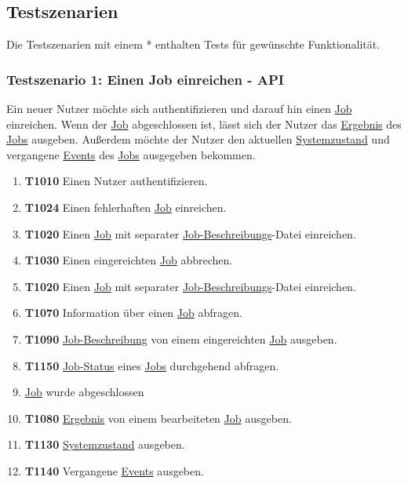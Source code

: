 \subsection{Testszenarien}
Die Testszenarien mit einem * enthalten Tests für gewünschte Funktionalität.

\subsubsection{Testszenario 1: Einen Job einreichen - API}
Ein neuer \gls{Nutzer} möchte sich authentifizieren und darauf hin einen \hyperref[B:Jobs]{Job} einreichen. Wenn der \hyperref[B:Jobs]{Job} abgeschlossen ist, lässt sich der \gls{Nutzer} das \hyperref[B:Job-Ergebnis]{Ergebnis} des \hyperref[B:Jobs]{Jobs} ausgeben. Außerdem möchte der \gls{Nutzer} den aktuellen \hyperref[B:Systemzustand]{Systemzustand} und vergangene \hyperref[B:Event]{Events} des \hyperref[B:Jobs]{Jobs} ausgegeben bekommen.

\begin{enumerate}
    \item \textbf{T1010} Einen \gls{Nutzer} authentifizieren.
    
    \item \textbf{T1024} Einen fehlerhaften \hyperref[B:Jobs]{Job} einreichen.
    
    \item \textbf{T1020} Einen \hyperref[B:Jobs]{Job} mit separater \hyperref[B:Job-Beschreibung]{Job-Beschreibungs}-Datei einreichen. 
    
    \item \textbf{T1030} Einen eingereichten \hyperref[B:Jobs]{Job} abbrechen.
    
    \item \textbf{T1020} Einen \hyperref[B:Jobs]{Job} mit separater \hyperref[B:Job-Beschreibung]{Job-Beschreibungs}-Datei einreichen. 
    
    \item \textbf{T1070} Information über einen \hyperref[B:Jobs]{Job} abfragen.
    
    \item \textbf{T1090} \hyperref[B:Job-Beschreibung]{Job-Beschreibung} von einem eingereichten \hyperref[B:Jobs]{Job} ausgeben.
    
    \item \textbf{T1150} \hyperref[B:Job-Status]{Job-Status} eines \hyperref[B:Jobs]{Jobs} durchgehend abfragen.
    
    \item \hyperref[B:Jobs]{Job} wurde abgeschlossen 
    
    \item \textbf{T1080} \hyperref[B:Job-Ergebnis]{Ergebnis} von einem bearbeiteten \hyperref[B:Jobs]{Job} ausgeben. 
    
    \item \textbf{T1130} \hyperref[B:Systemzustand]{Systemzustand} ausgeben. 
    
    \item \textbf{T1140} Vergangene \hyperref[B:Event]{Events} ausgeben. 
    
\end{enumerate}

